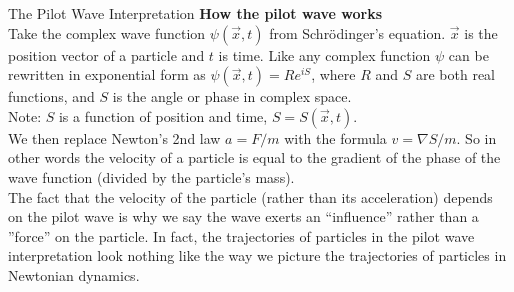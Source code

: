 \documentclass[9pt,usenames,dvipsnames]{beamer}
\begin{document}
\begin{frame}[t]{The Pilot Wave Interpretation}
\vspace{0pt}
{\bf How the pilot wave works}
\vspace{8pt}\\
    Take the complex wave function $\psi(\vec{x},t)$ from Schrödinger's
    equation. $\vec{x}$ is the position vector of a particle and $t$ 
    is time. Like any complex function $\psi$ can be rewritten in exponential 
    form as $\psi(\vec{x},t)=Re^{iS}$, where $R$ and $S$
    are both real functions, and $S$ is the angle or phase in complex space.
    \vspace{6pt}\\
    Note: $S$ is a function of position and time, $S=S(\vec{x},t).$
    \vspace{6pt}\\
    We then replace Newton's 2nd law $a = F/m$ with the formula 
    $v = \nabla S / m$. So in other words the velocity of a particle is 
    equal to the gradient of the phase of the wave function (divided by 
    the particle's mass). 
    \vspace{6pt}\\
    The fact that the velocity of the particle (rather than its acceleration)
    depends on the pilot wave is why we say the wave exerts an ``influence''
    rather than a ''force'' on the particle. In fact, the trajectories
    of particles in the pilot wave interpretation look nothing like the way
    we picture the trajectories of particles in Newtonian dynamics.
\end{frame}
\end{document}

